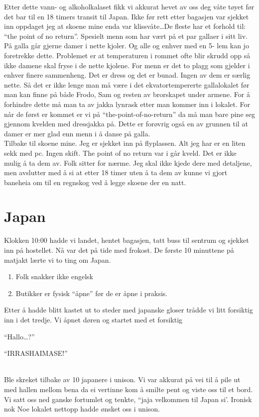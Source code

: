 Etter dette vann- og alkoholkalaset fikk vi akkurat hevet av oss deg
våte tøyet før det bar til en 18 timers transit til Japan. Ikke før
rett etter bagasjen var sjekket inn oppdaget jeg at skoene mine enda
var klissvåte\ldots De fleste har et forhold til: ``the
point of no return''. Spesielt menn som har vært på et par gallaer
i sitt liv.\\ På galla går gjerne damer i nette kjoler. Og alle og
enhver med en 5- lem kan jo foretrekke dette. Problemet er at
temperaturen i rommet ofte blir skrudd opp så ikke damene skal fryse i
de nette kjolene. For menn er det to plagg som gjelder i enhver
finere sammenheng. Det er dress og det er bunad. Ingen av dem er
særlig nette. Så det er ikke lenge man må være i det
ekvatortempererte gallalokalet før man kan finne på både Frodo, Sam og
resten av brorskapet under armene. For å forhindre dette må man ta av
jakka lynrask etter man kommer inn i lokalet. For når de først er
kommet er vi på ``the-point-of-no-return'' da må man bare pine seg
gjennom kvelden med dressjakka på. Dette er forøvrig også en av
grunnen til at damer er mer glad enn menn i å danse på galla. \\

Tilbake til skoene mine. Jeg er sjekket inn på flyplassen. Alt jeg har
er en liten sekk med pc. Ingen skift. The point of no return var i går
kveld. Det er ikke mulig å ta dem av. Folk sitter for nærme. Jeg skal
ikke kjede dere med detaljene, men avslutter med å si at etter 18
timer uten å ta dem av kunne vi gjort baneheia om til en regnskog ved
å legge skoene der en natt.



\section{Japan}
Klokken 10:00 hadde vi landet, hentet bagasjen, tatt buss til sentrum
og sjekket inn på hostellet. Nå var det på tide med frokost. De første
10 minuttene på matjakt lærte vi to ting om Japan.

\begin{enumerate}
	\item Folk snakker ikke engelsk
	\item Butikker er fysisk ``åpne'' før de er åpne i praksis.
\end{enumerate}

Etter å hadde blitt kastet ut to steder med japanske
gloser trådde vi litt forsiktig inn i det tredje. Vi åpnet
døren og startet med et forsiktig
\begin{dialouge}
	\item ``Hallo\ldots?''
	\item ``IRRASHAIMASE!'' 
\end{dialouge}
\\Ble skreket tilbake av 10 japanere i	unison.	
Vi var akkurat på vei til
å pile ut med hallen mellom bena da ei vertinne kom å smilte pent og
viste oss til et bord. Vi satt oss ned ganske fortumlet og tenkte,
``jaja velkommen til Japan si'. Ironisk nok Noe lokalet nettopp hadde ønsket oss i
unison. 

